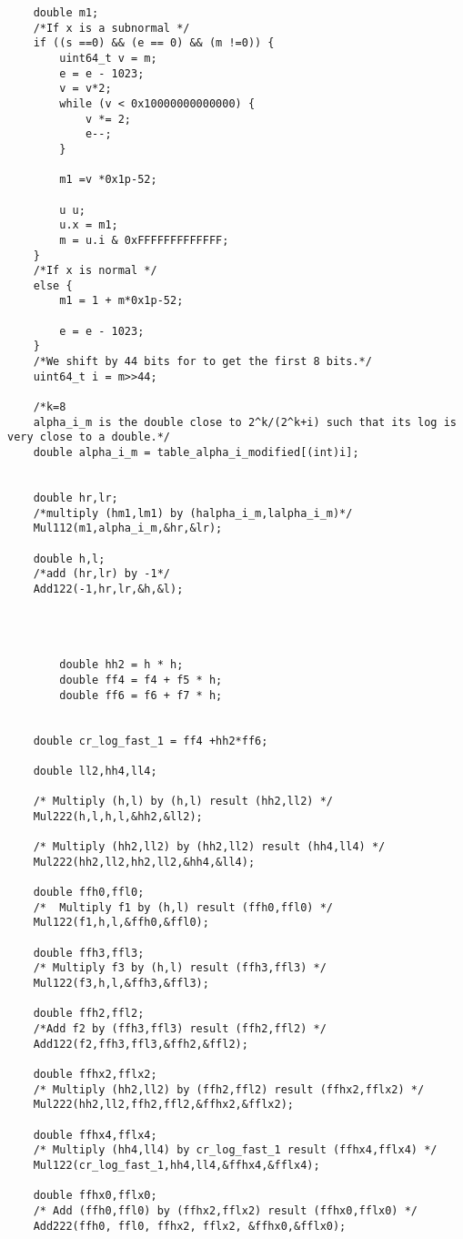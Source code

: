 \begin{lstlisting}
    double m1;
    /*If x is a subnormal */
    if ((s ==0) && (e == 0) && (m !=0)) {
        uint64_t v = m;
        e = e - 1023;
        v = v*2;
        while (v < 0x10000000000000) {
            v *= 2;
            e--;
        }
        
        m1 =v *0x1p-52;
       
        u u;
        u.x = m1;
        m = u.i & 0xFFFFFFFFFFFFF;
    }
    /*If x is normal */
    else {
        m1 = 1 + m*0x1p-52;
       
        e = e - 1023;
    }
    /*We shift by 44 bits for to get the first 8 bits.*/
    uint64_t i = m>>44;
    
    /*k=8
    alpha_i_m is the double close to 2^k/(2^k+i) such that its log is very close to a double.*/
    double alpha_i_m = table_alpha_i_modified[(int)i];
    
   
    double hr,lr;
    /*multiply (hm1,lm1) by (halpha_i_m,lalpha_i_m)*/
    Mul112(m1,alpha_i_m,&hr,&lr);
    
    double h,l;
    /*add (hr,lr) by -1*/
    Add122(-1,hr,lr,&h,&l);

    
    
    
        double hh2 = h * h;
        double ff4 = f4 + f5 * h;
        double ff6 = f6 + f7 * h;
        

    double cr_log_fast_1 = ff4 +hh2*ff6;
    
    double ll2,hh4,ll4;
    
    /* Multiply (h,l) by (h,l) result (hh2,ll2) */
    Mul222(h,l,h,l,&hh2,&ll2);
    
    /* Multiply (hh2,ll2) by (hh2,ll2) result (hh4,ll4) */
    Mul222(hh2,ll2,hh2,ll2,&hh4,&ll4);
    
    double ffh0,ffl0;
    /*  Multiply f1 by (h,l) result (ffh0,ffl0) */
    Mul122(f1,h,l,&ffh0,&ffl0);

    double ffh3,ffl3;
    /* Multiply f3 by (h,l) result (ffh3,ffl3) */
    Mul122(f3,h,l,&ffh3,&ffl3);

    double ffh2,ffl2;
    /*Add f2 by (ffh3,ffl3) result (ffh2,ffl2) */
    Add122(f2,ffh3,ffl3,&ffh2,&ffl2);

    double ffhx2,fflx2;
    /* Multiply (hh2,ll2) by (ffh2,ffl2) result (ffhx2,fflx2) */
    Mul222(hh2,ll2,ffh2,ffl2,&ffhx2,&fflx2);

    double ffhx4,fflx4;
    /* Multiply (hh4,ll4) by cr_log_fast_1 result (ffhx4,fflx4) */
    Mul122(cr_log_fast_1,hh4,ll4,&ffhx4,&fflx4);

    double ffhx0,fflx0;
    /* Add (ffh0,ffl0) by (ffhx2,fflx2) result (ffhx0,fflx0) */
    Add222(ffh0, ffl0, ffhx2, fflx2, &ffhx0,&fflx0);
    

\end{lstlisting}
